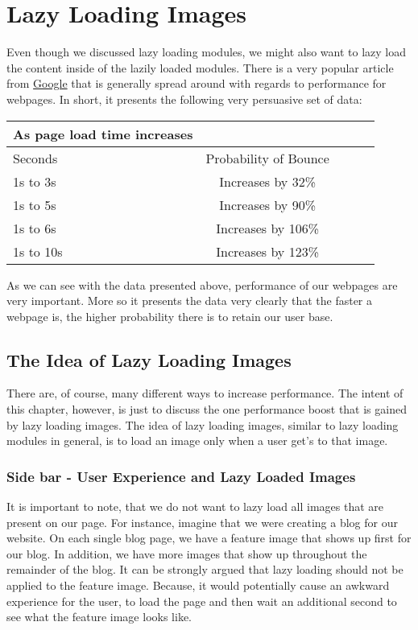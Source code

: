 \chapter{ Lazy Loading Images }

Even though we discussed lazy loading modules, we might also want to lazy load 
the content inside of the lazily loaded modules. There is a very popular 
article from \href{https://www.thinkwithgoogle.com/marketing-resources/data-measurement/mobile-page-speed-new-industry-benchmarks/}{Google} 
that is generally spread around with regards to performance for webpages. 
In short, it presents the following very persuasive set of data: 

\begin{center}
  \begin{tabular}{@{} l *4c @{}}
    \toprule
    {\color{red}As page load time increases}\\
    \toprule
    {\color{red}Seconds} & Probability of Bounce \\
    \midrule
    1s to 3s       & Increases by 32\% \\
    1s to 5s       & Increases by 90\% \\
    1s to 6s       & Increases by 106\% \\
    1s to 10s       & Increases by 123\% \\
  \end{tabular}
\end{center}  

As we can see with the data presented above, performance of our webpages are 
very important. More so it presents the data very clearly that the faster 
a webpage is, the higher probability there is to retain our user base. 

\section{The Idea of Lazy Loading Images}
There are, of course, many different ways to increase performance. The intent 
of this chapter, however, is just to discuss the one performance boost that 
is gained by lazy loading images. The idea of lazy loading images, similar 
to lazy loading modules in general, is to load an image only when a user 
get's to that image. 

\subsection{Side bar - User Experience and Lazy Loaded Images}
It is important to note, that we do not want to lazy load all images
that are present on our page. For instance, imagine that we were creating a 
blog for our website. On each single blog page, we have a feature image 
that shows up first for our blog. In addition, we have more images that 
show up throughout the remainder of the blog. It can be strongly argued 
that lazy loading should not be applied to the feature image. Because, it 
would potentially cause an awkward experience for the user, to load the page 
and then wait an additional second to see what the feature image looks like. 

